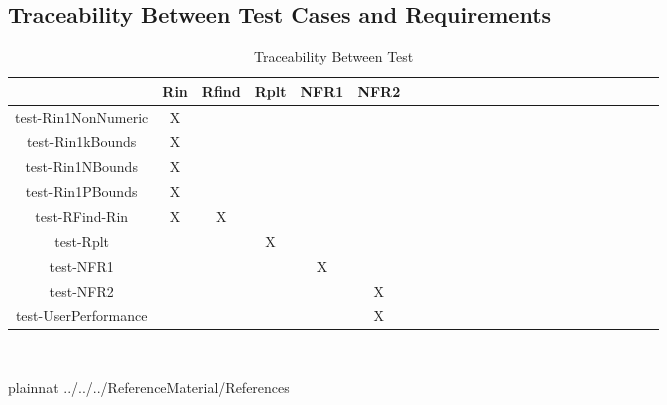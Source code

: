 \documentclass[12pt, titlepage]{article}
\begin{document}
\newpage
\subsection{Traceability Between Test Cases and Requirements}
\label{traceability}
\begin{table}[h]
	\centering
	\begin{tabular}{|c|c|c|c|c|c|c|c|c|c|c|c|c|c|c|c|c|c|c|c|c|c|c|c|}
		\hline        
		& Rin& Rfind & Rplt & NFR1 & NFR2 \\
		\hline
		test-Rin1NonNumeric     &X & & & &  \\ \hline
		test-Rin1kBounds    & X& & & &   \\ \hline
		test-Rin1NBounds    &X & & & &  \\ \hline 
		test-Rin1PBounds    &X & & & &    \\ \hline 
		test-RFind-Rin    &X &X & & &   \\ \hline 
		test-Rplt    & & &X & &    \\ \hline 
		test-NFR1  & & & &X &   \\ \hline 
		test-NFR2  & & & & &X    \\ \hline 
		test-UserPerformance  & & & & &X  \\
		\hline
	\end{tabular}\\
	\caption{Traceability Between Test }
	\label{Table:D_1}
\end{table} 
				

\clearpage
 {plainnat}
 {../../../ReferenceMaterial/References} 

%	
	
	 
	
	
\end{document}
